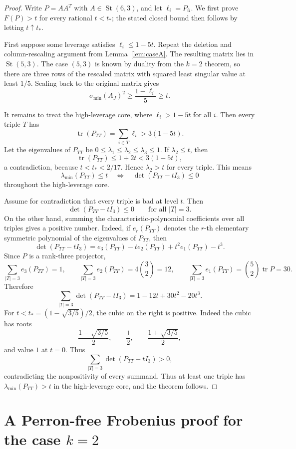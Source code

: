 \documentclass[11pt]{article}
\numberwithin{equation}{section}
\theoremstyle{definition}
\newcommand{\St}{\operatorname{St}}
\newcommand{\tr}{\operatorname{tr}}
\begin{document}
\begin{proof}
Write $P=AA^T$ with $A\in\St(6,3)$, and let $\ell_i=P_{ii}$.
We first prove $F(P)>t$ for every rational $t<t_*$; the stated closed bound
then follows by letting $t\uparrow t_*$.

First suppose some leverage satisfies $\ell_i\le1-5t$.  Repeat the deletion and
column-rescaling argument from Lemma~\ref{lem:caseA}.  The resulting matrix
lies in $\St(5,3)$.  The case $(5,3)$ is known by duality from the $k=2$
theorem, so there are three rows of the rescaled matrix with squared least
singular value at least $1/5$.  Scaling back to the original matrix gives
\[
  \sigma_{\min}(A_J)^2\ge \frac{1-\ell_i}{5}\ge t.
\]

It remains to treat the high-leverage core, where $\ell_i>1-5t$ for all $i$.
Then every triple $T$ has
\[
  \tr(P_{TT})=\sum_{i\in T}\ell_i>3(1-5t).
\]
Let the eigenvalues of $P_{TT}$ be
$0\le\lambda_1\le\lambda_2\le\lambda_3\le1$.  If
$\lambda_2\le t$, then
\[
  \tr(P_{TT})\le 1+2t<3(1-5t),
\]
a contradiction, because $t<t_*<2/17$.  Hence $\lambda_2>t$ for every triple.
This means
\[
  \lambda_{\min}(P_{TT})\le t
  \quad\Longleftrightarrow\quad
  \det(P_{TT}-tI_3)\le0
\]
throughout the high-leverage core.

Assume for contradiction that every triple is bad at level $t$.  Then
\[
  \det(P_{TT}-tI_3)\le0
  \qquad\text{for all } |T|=3.
\]
On the other hand, summing the characteristic-polynomial coefficients over all
triples gives a positive number.  Indeed, if $e_r(P_{TT})$ denotes the $r$-th
elementary symmetric polynomial of the eigenvalues of $P_{TT}$, then
\[
  \det(P_{TT}-tI_3)=e_3(P_{TT})-t e_2(P_{TT})+t^2e_1(P_{TT})-t^3.
\]
Since $P$ is a rank-three projector,
\[
  \sum_{|T|=3}e_3(P_{TT})=1,\qquad
  \sum_{|T|=3}e_2(P_{TT})=4\binom32=12,\qquad
  \sum_{|T|=3}e_1(P_{TT})=\binom52\tr P=30.
\]
Therefore
\[
  \sum_{|T|=3}\det(P_{TT}-tI_3)
  =1-12t+30t^2-20t^3.
\]
For $t<t_*=(1-\sqrt{3/5})/2$, the cubic on the right is positive.  Indeed the
cubic has roots
\[
  \frac{1-\sqrt{3/5}}2,\qquad \frac12,\qquad
  \frac{1+\sqrt{3/5}}2,
\]
and value $1$ at $t=0$.  Thus
\[
  \sum_{|T|=3}\det(P_{TT}-tI_3)>0,
\]
contradicting the nonpositivity of every summand.  Thus at least one triple has
$\lambda_{\min}(P_{TT})>t$ in the high-leverage core, and the theorem follows.
\end{proof}

\section{A Perron-free Frobenius proof for the case \texorpdfstring{\(k=2\)}{k=2}}
\end{document}
